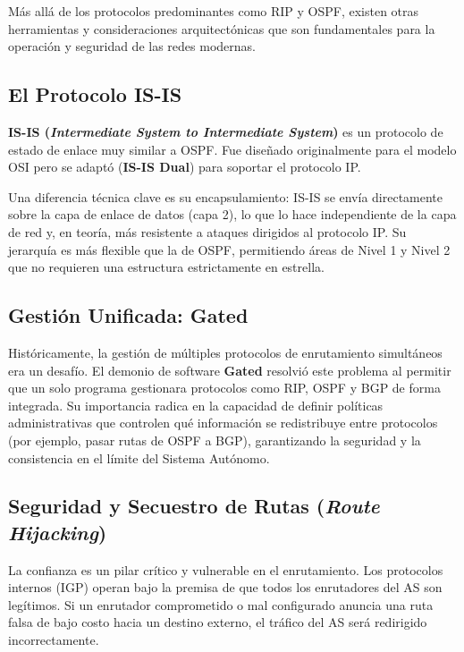 Más allá de los protocolos predominantes como RIP y OSPF, existen otras herramientas y consideraciones arquitectónicas que son fundamentales para la operación y seguridad de las redes modernas.

\subsection{El Protocolo IS-IS}

\textbf{IS-IS (\textit{Intermediate System to Intermediate System})} es un protocolo de estado de enlace muy similar a OSPF. Fue diseñado originalmente para el modelo OSI pero se adaptó (\textbf{IS-IS Dual}) para soportar el protocolo IP. 

Una diferencia técnica clave es su encapsulamiento: IS-IS se envía directamente sobre la capa de enlace de datos (capa 2), lo que lo hace independiente de la capa de red y, en teoría, más resistente a ataques dirigidos al protocolo IP. Su jerarquía es más flexible que la de OSPF, permitiendo áreas de Nivel 1 y Nivel 2 que no requieren una estructura estrictamente en estrella.

\subsection{Gestión Unificada: Gated}

Históricamente, la gestión de múltiples protocolos de enrutamiento simultáneos era un desafío. El demonio de software \textbf{Gated} resolvió este problema al permitir que un solo programa gestionara protocolos como RIP, OSPF y BGP de forma integrada. Su importancia radica en la capacidad de definir políticas administrativas que controlen qué información se redistribuye entre protocolos (por ejemplo, pasar rutas de OSPF a BGP), garantizando la seguridad y la consistencia en el límite del Sistema Autónomo.

\subsection{Seguridad y Secuestro de Rutas (\textit{Route Hijacking})}

La confianza es un pilar crítico y vulnerable en el enrutamiento. Los protocolos internos (IGP) operan bajo la premisa de que todos los enrutadores del AS son legítimos. Si un enrutador comprometido o mal configurado anuncia una ruta falsa de bajo costo hacia un destino externo, el tráfico del AS será redirigido incorrectamente.

